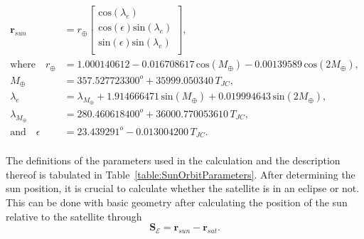 \begin{equation}
\label{eq:sunPosition}
	\begin{aligned}
		\mathbf{r}_{sun} &= r_{\oplus} \begin{bmatrix}
		\text{cos}(\lambda_e) \\ \text{cos}(\epsilon)\text{sin}(\lambda_e) \\ \text{sin}(\epsilon)\text{sin}(\lambda_e) \\
		\end{bmatrix}, \\
		\text{where} \quad r_{\oplus} &= \num{1.000140612} - \num{0.016708617} \, \text{cos}(M_{\oplus}) - \num{0.00139589} \, \text{cos}(2M_{\oplus}), \\
		M_{\oplus} &= \num{357.527723300}^o + \num{35999.050340} \, T_{JC}, \\
		\lambda_e &= \lambda_{M_{\oplus}} + \num{1.914666471} \, \text{sin}(M_{\oplus}) + \num{0.019994643} \, \text{sin}(2M_{\oplus}), \\
		\lambda_{M_{\oplus}} &= \num{280.460618400}^o + \num{36000.770053610} \, T_{JC}, \\
		\text{and} \quad \epsilon &= \num{23.439291}^o - \num{0.013004200} \, T_{JC}. \\
	\end{aligned}
\end{equation}

The definitions of the parameters used in the calculation and the description thereof is tabulated in Table~\ref{table:SunOrbitParameters}. After determining the sun position, it is crucial to calculate whether the satellite is in an eclipse or not. This can be done with basic geometry after calculating the position of the sun relative to the satellite through
\begin{equation}
\mathbf{S}_{\mathcal{E}} = \mathbf{r}_{sun} - \mathbf{r}_{sat}.
\end{equation}


